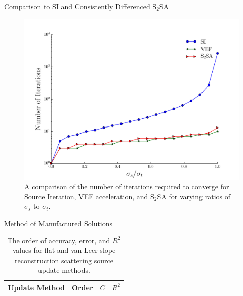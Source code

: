 \documentclass[10pt]{beamer}
\begin{document}
\begin{frame}{Comparison to SI and Consistently Differenced S$_2$SA}

	\begin{figure}[htb]
		\centering
		\includegraphics[width=.75\textwidth]{figs/si_vef_s2sa.pdf} 
		\caption{A comparison of the number of iterations required to converge for Source Iteration, VEF acceleration, and S$_2$SA for varying ratios of $\sigma_s$ to $\sigma_t$. } 
		\label{fig:si_vef_s2sa}
	\end{figure}

\end{frame}

\begin{frame}{Method of Manufactured Solutions}

	\begin{table}[htb]
	\centering
	\begin{tabular}{|c|c|c|c|}
	\hline
	Update Method & Order & $C$ & $R^2$ \\ 
	\hline
		
	\hline
	\end{tabular}
	\caption{The order of accuracy, error, and $R^2$ values for flat and van Leer slope reconstruction scattering source update methods. }
	\label{tab:mms}
	\end{table}

\end{frame}
\end{document}
